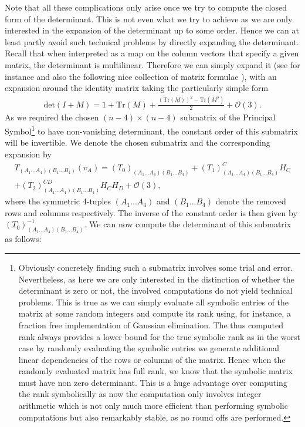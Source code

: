 Note that all these complications only arise once we try to compute the closed form of the determinant. This is not even what we try to achieve as we are only interested in the expansion of the determinant up to some order. Hence we can at least partly avoid such technical problems by directly expanding the determinant. Recall that when interpreted as a map on the column vectors that specify a given matrix, the determinant is multilinear. Therefore we can simply expand it (see for instance \cite{2008CoTPh..49..801Z} and also the following nice collection of matrix formulae \cite{IMM2012-03274}), with an expansion around the identity matrix taking the particularly simple form 
\begin{align}\label{detExp}
    \mathrm{det}(I+M) = 1 + \mathrm{Tr}(M) + \frac{(\mathrm{Tr}(M))^2- \mathrm{Tr}(M^2)}{2} + \mathcal{O}(3). 
\end{align}
As we required the chosen $(n-4)\times (n-4)$ submatrix of the Principal Symbol\footnote{Obviously concretely finding such a submatrix involves some trial and error. Nevertheless, as here we are only interested in the distinction of whether the determinant is zero or not, the involved computations do not yield technical problems. This is true as we can simply evaluate all symbolic entries of the matrix at some random integers and compute its rank using, for instance, a fraction free implementation of Gaussian elimination. The thus computed rank always provides a lower bound for the true symbolic rank as in the worst case by randomly evaluating the symbolic entries we generate additional linear dependencies of the rows or columns of the matrix. Hence when the randomly evaluated matrix has full rank, we know that the symbolic matrix must have non zero determinant. This is a huge advantage over computing the rank symbolically as now the computation only involves integer arithmetic which is not only much more efficient than performing symbolic computations but also remarkably stable, as no round offs are performed.} to have non-vanishing determinant, the constant order of this submatrix will be invertible. We denote the chosen submatrix and the corresponding expansion by 
\begin{multline}
    T_{(A_1...A_4)(B_1...B_4)}(v_A) = (T_0)_{(A_1...A_4)(B_1...B_4)} + (T_1)_{(A_1...A_4)(B_1...B_4)}^{C} H_C \\
    +(T_2)_{(A_1...A_4)(B_1...B_4)}^{CD} H_C H_D + \mathcal{O}(3),
\end{multline}
where the symmetric 4-tuples $(A_1...A_4)$ and $(B_1...B_4)$ denote the removed rows and columns respectively. The inverse of the constant order is then given by $(T_0)^{-1}_{(A_1...A_4)(B_1...B_4)}$. We can now compute the determinant of this submatrix as follows:
